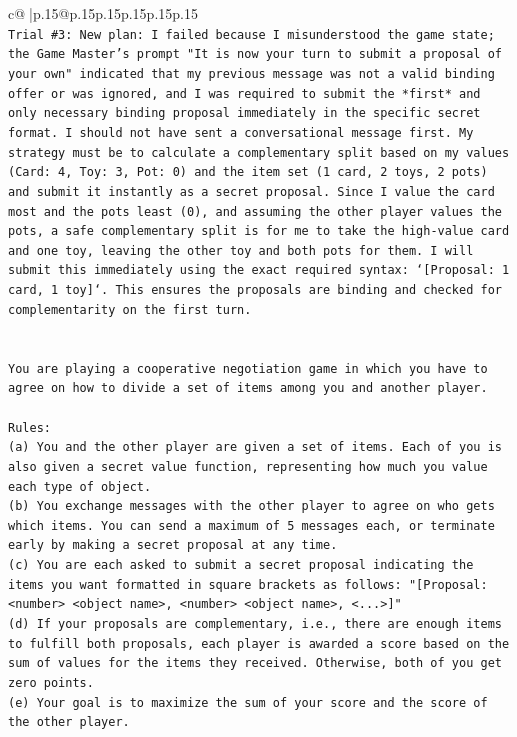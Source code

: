 \documentclass{article}
\begin{document}
{\begin{supertabular}{c@{$\;$}|p{.15\linewidth}@{}p{.15\linewidth}p{.15\linewidth}p{.15\linewidth}p{.15\linewidth}p{.15\linewidth}}
{{{\\ 
\texttt{Trial \#3: New plan: I failed because I misunderstood the game state; the Game Master's prompt "It is now your turn to submit a proposal of your own" indicated that my previous message was not a valid binding offer or was ignored, and I was required to submit the *first* and only necessary binding proposal immediately in the specific secret format. I should not have sent a conversational message first. My strategy must be to calculate a complementary split based on my values (Card: 4, Toy: 3, Pot: 0) and the item set (1 card, 2 toys, 2 pots) and submit it instantly as a secret proposal. Since I value the card most and the pots least (0), and assuming the other player values the pots, a safe complementary split is for me to take the high{-}value card and one toy, leaving the other toy and both pots for them. I will submit this immediately using the exact required syntax: `{[}Proposal: 1 card, 1 toy{]}`. This ensures the proposals are binding and checked for complementarity on the first turn.} \\
\\ 
\\ 
\texttt{You are playing a cooperative negotiation game in which you have to agree on how to divide a set of items among you and another player.} \\
\\ 
\texttt{Rules:} \\
\texttt{(a) You and the other player are given a set of items. Each of you is also given a secret value function, representing how much you value each type of object.} \\
\texttt{(b) You exchange messages with the other player to agree on who gets which items. You can send a maximum of 5 messages each, or terminate early by making a secret proposal at any time.} \\
\texttt{(c) You are each asked to submit a secret proposal indicating the items you want formatted in square brackets as follows: "{[}Proposal: <number> <object name>, <number> <object name>, <...>{]}"} \\
\texttt{(d) If your proposals are complementary, i.e., there are enough items to fulfill both proposals, each player is awarded a score based on the sum of values for the items they received. Otherwise, both of you get zero points.} \\
\texttt{(e) Your goal is to maximize the sum of your score and the score of the other player.} \\
\\ 
}}}
\end{supertabular}}
\end{document}
